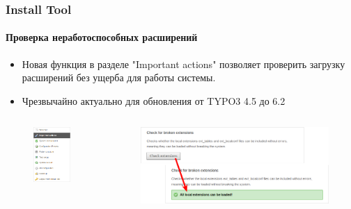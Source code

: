 \begin{frame}[fragile]
	\frametitle{Install Tool}
	\framesubtitle{Проверка неработоспособных расширений}

	\begin{itemize}
		\item Новая функция в разделе "Important actions" позволяет проверить загрузку расширений без ущерба для работы системы.
		\item Чрезвычайно актуально для обновления от TYPO3 4.5 до 6.2
	\end{itemize}

	\begin{columns}[T]
		\begin{column}{.3\textwidth}
			\begin{figure}\vspace*{-0.4cm}
				\includegraphics[width=0.7\linewidth]{Images/InstallTool/ImportantActions.png}
			\end{figure}
		\end{column}
		\begin{column}{.7\textwidth}
			\begin{figure}\vspace*{-0.4cm}
				\includegraphics[width=1\linewidth]{Images/InstallTool/CheckForBrokenExtensions.png}
			\end{figure}
		\end{column}
	\end{columns}


\end{frame}
